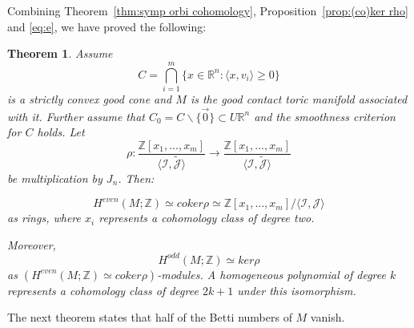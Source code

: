\documentclass[12pt]{amsart}
\def\Z {{\mathbb{Z}}}
\def\R {{\mathbb{R}}}
\def\I {{\mathcal{I}}}
\def\J {{\mathcal{J}}}
\newtheorem{theorem}{Theorem}[section]
\theoremstyle{definition}
\numberwithin{equation}{section}
\begin{document}
Combining Theorem~\ref{thm:symp orbi cohomology},
Proposition~\ref{prop:(co)ker rho} and \eqref{eq:e}, we have proved
the following:
\begin{theorem}\label{thm:contact cohomology}
Assume \begin{equation}
 C= \bigcap_{i=1}^{m}\{x\in \R^n: \langle x, v_{i}\rangle \geq 0\}
\end{equation} is a strictly convex good cone and $M$ is the good contact toric
manifold associated with it. Further assume that
$C_{0}=C\backslash\{\vec{0}\}\subset U\R^n$ and the smoothness
criterion for $C$ holds. Let
\begin{equation}\rho:\frac{\Z[x_{1},...,x_{m}]}{\langle \mathcal
{I},\widetilde{\J} \rangle}\rightarrow
\frac{\Z[x_{1},...,x_{m}]}{\langle \mathcal
{I},\widetilde{\J}\rangle}
\end{equation}
be multiplication by $J_{n}$. Then:

\begin{equation}\label{eq:7}
H^{even}(M;\Z)\simeq coker\rho\simeq \Z[x_{1},...,x_{m}]/\langle
\I,\J \rangle\end{equation} as rings, where $x_{i}$ represents a
cohomology class of degree two.

 Moreover,
\begin{equation}\label{eq:8}
H^{odd}(M;\Z)\simeq ker\rho \end{equation} as $(H^{even}(M;\Z)\simeq
coker\rho)$-modules. A homogeneous polynomial of degree $k$
represents a cohomology class of degree $2k+1$ under this
isomorphism.
\end{theorem}

The next theorem states that half of the Betti numbers of $M$
vanish.
\end{document}

